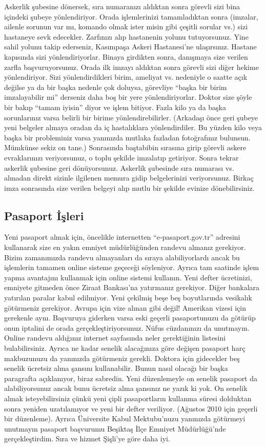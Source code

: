 \documentclass[12pt]{article}
\theoremstyle{break}
\begin{document}
Askerlik şubesine dönersek, sıra numaranızı aldıktan sonra görevli sizi bina içindeki şubeye yönlendiriyor. Orada işlemlerinizi tamamladıktan sonra (imzalar, ailenle sorunun var mı, komando olmak ister misin gibi çeşitli sorular vs.) sizi hastaneye sevk edecekler. Zarfınızı alıp hastanenin yolunu tutuyorsunuz. Yine sahil yolunu takip ederseniz, Kasımpaşa Askeri Hastanesi’ne ulaşırsınız. Hastane kapısında sizi yönlendiriyorlar. 
Binaya girdikten sonra, danışmaya size verilen zarfla başvuruyorsunuz. Orada ilk imzayı aldıktan sonra görevli sizi diğer hekime yönlendiriyor. Sizi yönlendirdikleri birim, ameliyat vs. nedeniyle o saatte açık değilse ya da bir başka nedenle çok doluysa, görevliye “başka bir birim imzalayabilir mi” derseniz daha boş bir yere yönlendiriyorlar. Doktor size şöyle bir bakıp “tamam iyisin” diyor ve işlem bitiyor. Fazla kilo ya da başka sorunlarınız varsa belirli bir birime yönlendirebilirler. (Arkadaşı önce geri şubeye yeni belgeler almaya oradan da iç hastalıklara yönlendirdiler. Bu yüzden kilo veya başka bir probleminiz varsa yanınızda mutlaka fazladan fotoğrafınız bulunsun. Mümkünse sekiz on tane.) Sonrasında baştabibin sırasına girip görevli askere evraklarınızı veriyorsunuz, o toplu şekilde imzalatıp getiriyor. Sonra tekrar askerlik şubesine geri dönüyorsunuz. Askerlik şubesinde sıra numarası vs. almadan direkt sizinle ilgilenen memura gidip belgelerinizi veriyorsunuz. Birkaç imza sonrasında size verilen belgeyi alıp mutlu bir şekilde evinize dönebilirsiniz.


\subsection{Pasaport İşleri}
Yeni pasaport almak için, öncelikle internetten “e-pasaport.gov.tr” adresini kullanarak size en yakın emniyet müdürlüğünden randevu almanız gerekiyor. Bizim zamanımızda randevu almayanları da sıraya alabiliyorlardı ancak bu işlemlerin tamamen online sisteme geçeceği söyleniyor. Ayrıca tam saatinde işlem yapma avantajını kullanmak için online sistemi kullanın. Yeni defter ücretinizi, emniyete gitmeden önce Ziraat Bankası’na yatırmanız gerekiyor. Diğer bankalara yatırılan paralar kabul edilmiyor. Yeni çekilmiş beşe beş boyutlarında vesikalık götürmeniz gerekiyor. Avrupa için vize alınan gibi değil! Amerikan vizesi için gerekenle aynı. Başvuruya giderken varsa eski geçerli pasaportunuzu da götürüp onun iptalini de orada gerçekleştiriyorsunuz. Nüfus cüzdanınızı da unutmayın. Online randevu aldığınız internet sayfasında neler gerektiğinin listesini bulabilirsiniz. Ayrıca ne kadar senelik alacağınıza göre değişen pasaport harç makbuzunuzu da yanınızda götürmeniz gerekli. Doktora için gidecekler beş senelik ücretsiz alma şansını kullanabilir. Bunun nasıl olacağı bir başka paragrafta açıklanıyor, biraz sabredin. Yeni düzenlemeyle on senelik pasaport da alabiliyorsunuz ancak bunu ücretsiz alma şansınız ne yazık ki yok. On senelik almak isteyebilirsiniz çünkü yeni çipli pasaportların kullanma süresi dolduktan sonra yeniden uzatılamıyor ve yeni bir defter veriliyor. (Ağustos 2010 için geçerli bir düzenleme). Ayrıca Üniversite Kabul Mektubu’nuzu yanınızda götürmeyi unutmayın pasaport başvurumu Beşiktaş İlçe Emniyet Müdürlüğü’nde gerçekleştirdim. Sıra ve hizmet Şişli’ye göre daha iyi.
\end{document}
